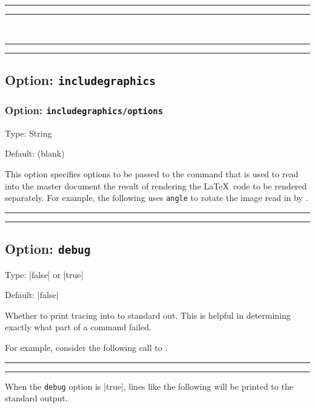 \documentclass[10pt]{ltxdoc}
\newcommand{\opt}[1]{\texttt{#1}}
\def\sz{%
  \rule{0.2em}{7pt}%
  \llap{\rule[8pt]{0.2em}{2pt}}%
}
\begin{document}
\begin{tcblisting}{}
\sz{}\sz~
\sz{}\sz
\vspace{2in}
\end{tcblisting}

\subsection{Option: \opt{includegraphics}}
\label{subsec:includegraphics}

\subsubsection{Option: \opt{includegraphics/options}}
\label{subsubsec:includegraphics/options}

Type: String

Default: (blank)

This option specifies options to be passed to the 
command that is used to read into the master document the result of
rendering the \LaTeX\ code to be rendered separately.
For example, the following uses \opt{angle} to rotate the image read in
by .

\begin{tcblisting}{}
\sz{}\sz
\end{tcblisting}

\subsection{Option: \opt{debug}}
\label{subsec:debug}

Type: |false| or |true|

Default: |false|

Whether to print tracing into to standard out.
This is helpful in determining exactly what part of a command failed.

For example, consider the following call to .

\typeout{+++++++++++++++++}
\begin{tcblisting}{}
\sz{}\sz
\end{tcblisting}
\typeout{+++++++++++++++++}

When the \opt{debug} option is |true|, lines like the following will be
printed to the standard output.
\end{document}
